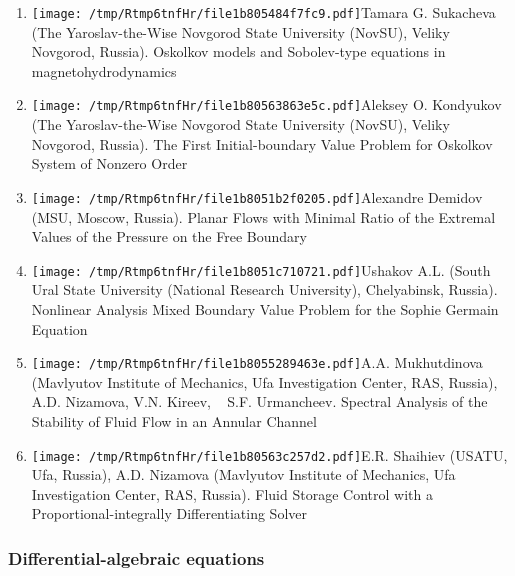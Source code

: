 \documentclass[
]{article}
\providecommand{\tightlist}{%
  \setlength{\itemsep}{0pt}\setlength{\parskip}{0pt}}
\begin{document}
\begin{enumerate}
\def\labelenumi{\arabic{enumi}.}
\tightlist
\item
  \protect\texttt{[image: /tmp/Rtmp6tnfHr/file1b805484f7fc9.pdf]}Tamara
  G. Sukacheva (The Yaroslav-the-Wise Novgorod State University (NovSU),
  Veliky Novgorod, Russia). Oskolkov models and Sobolev-type equations
  in magnetohydrodynamics
\item
  \protect\texttt{[image: /tmp/Rtmp6tnfHr/file1b80563863e5c.pdf]}Aleksey
  O. Kondyukov (The Yaroslav-the-Wise Novgorod State University (NovSU),
  Veliky Novgorod, Russia). The First Initial-boundary Value Problem for
  Oskolkov System of Nonzero Order
\item
  \protect\texttt{[image: /tmp/Rtmp6tnfHr/file1b8051b2f0205.pdf]}Alexandre
  Demidov (MSU, Moscow, Russia). Planar Flows with Minimal Ratio of the
  Extremal Values of the Pressure on the Free Boundary
\item
  \protect\texttt{[image: /tmp/Rtmp6tnfHr/file1b8051c710721.pdf]}Ushakov
  A.L. (South Ural State University (National Research University),
  Chelyabinsk, Russia). Nonlinear Analysis Mixed Boundary Value Problem
  for the Sophie Germain Equation
\item
  \protect\texttt{[image: /tmp/Rtmp6tnfHr/file1b8055289463e.pdf]}A.A.
  Mukhutdinova (Mavlyutov Institute of Mechanics, Ufa Investigation
  Center, RAS, Russia), A.D. Nizamova, V.N. Kireev, ~ S.F. Urmancheev.
  Spectral Analysis of the Stability of Fluid Flow in an Annular Channel
\item
  \protect\texttt{[image: /tmp/Rtmp6tnfHr/file1b80563c257d2.pdf]}E.R.
  Shaihiev (USATU, Ufa, Russia), A.D. Nizamova (Mavlyutov Institute of
  Mechanics, Ufa Investigation Center, RAS, Russia). Fluid Storage
  Control with a Proportional-integrally Differentiating Solver
\end{enumerate}

\hypertarget{dae}{%
\subsubsection{Differential-algebraic equations}\label{dae}}
\end{document}
